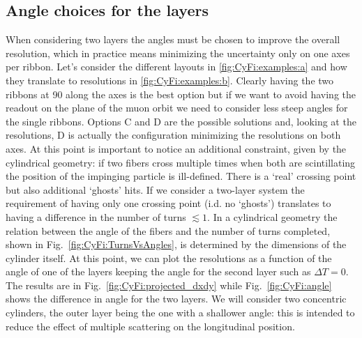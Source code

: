 \begin{refsection}
\subsection{Angle choices for the layers}
    When considering two layers the angles must be chosen to improve the overall resolution, which in practice means minimizing the uncertainty only on one axes per ribbon.
    Let's consider the different layouts in \ref{fig:CyFi:examples:a} and how they translate to resolutions in \ref{fig:CyFi:examples:b}.
    Clearly having the two ribbons at \SI{90}{\deg} along the axes is the best option but if we want to avoid having the readout on the plane of the muon orbit we need to consider less steep angles for the single ribbons.
    Options C and D are the possible solutions and, looking at the resolutions, D is actually the configuration minimizing the resolutions on both axes. 
    At this point is important to notice an additional constraint, given by the cylindrical geometry: if two fibers cross multiple times when both are scintillating the position of the impinging particle is ill-defined. There is a `real' crossing point but also additional `ghosts' hits.
    If we consider a two-layer system the requirement of having only one crossing point (i.d. no `ghosts') translates to having a difference in the number of turns $\lesssim1$. 
    In a cylindrical geometry the relation between the angle of the fibers and the number of turns completed, shown in Fig.~\ref{fig:CyFi:TurnsVsAngles}, is determined by the dimensions of the cylinder itself.
    At this point, we can plot the resolutions as a function of the angle of one of the layers keeping the angle for the second layer such as $\Delta T=0$. The results are in Fig.~\ref{fig:CyFi:projected_dxdy} while Fig.~\ref{fig:CyFi:angle} shows the difference in angle for the two layers.
    We will consider two concentric cylinders, the outer layer being the one with a shallower angle: this is intended to reduce the effect of multiple scattering on the longitudinal position.
    \begin{figure}
\end{figure}
\end{refsection}
